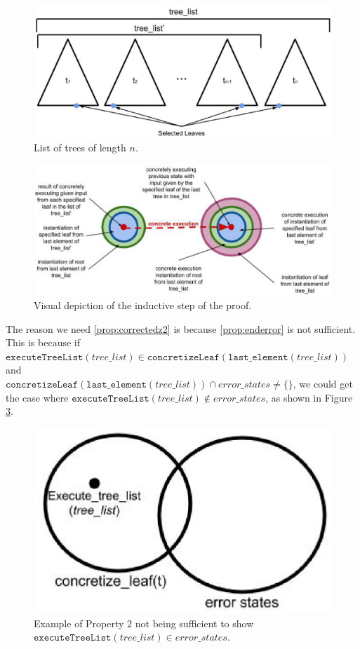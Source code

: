 \begin{figure}
\centering
\includegraphics[width=.8\textwidth]{tlist.eps}
\caption{List of trees of length $n$.}
\label{fig:tlist}
\end{figure}

\begin{figure}
\centering
\includegraphics[width=.8\textwidth]{set4.eps}
\caption{Visual depiction of the inductive step of the proof.}
\label{fig:indstep}
\end{figure}




The reason we need \ref{prop:correctedz2} is because \ref{prop:enderror} is not sufficient. 
This is because if $\mathtt{executeTreeList} (tree\_list) \in \mathtt{concretizeLeaf} (\mathtt{last\_element}(tree\_list))$ and \\
$\mathtt{concretizeLeaf} (\mathtt{last\_element} (tree\_list)) \cap error\_states \neq \{\}$, we could get the case where
$\mathtt{executeTreeList} (tree\_list) \notin error\_states$, as shown in Figure \ref{fig:Prop2}.

\begin{figure}
  \centering
\includegraphics[width=.4\textwidth]{prop2.eps}
\caption{Example of Property $2$ not being sufficient to show $\mathtt{executeTreeList} (tree\_list) \in error\_states$.}
\label{fig:Prop2}
\end{figure}
